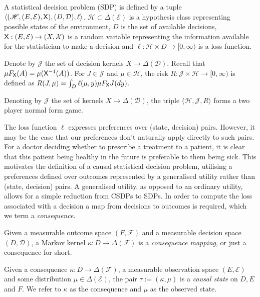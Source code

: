 \begin{definition}
A statistical decision problem (SDP) is defined by a tuple $\langle (\mathscr{H},(E,\mathcal{E}), \mathsf{X}), (D,\mathcal{D}), \ell\rangle$. $\mathscr{H}\subset\Delta(\mathcal{E})$ is a hypothesis class representing possible states of the environment, $D$ is the set of available decisions, $\mathsf{X}:(E,\mathcal{E})\to (X,\mathcal{X})$ is a random variable representing the information available for the statistician to make a decision and $\ell:\mathcal{H}\times D\to [0,\infty)$ is a loss function.

Denote by $\mathscr{J}$ the set of decision kernels $X\to \Delta(\mathcal{D})$. Recall that $\mu F_{\mathsf{X}}(A)=\mu(\mathsf{X}^{-1}(A))$. For $J\in \mathscr{J}$ and $\mu\in \mathcal{H}$, the risk $R:\mathscr{J}\times\mathscr{H}\to [0,\infty)$ is defined as $R(J,\mu) = \int_D \ell(\mu,y) \mu F_{\mathsf{X}} J(dy)$.

Denoting by $\mathscr{J}$  the set of kernels $X\to \Delta(\mathcal{D})$, the triple $\langle \mathscr{H}, \mathscr{J}, R\rangle$ forms a two player normal form game.
\end{definition}


The loss function $\ell$ expresses preferences over (state, decision) pairs. However, it may be the case that our preferences don't naturally apply directly to such pairs. For a doctor deciding whether to prescribe a treatment to a patient, it is clear that this patient being healthy in the future is preferable to them being sick. This motivates the definition of a causal statistical decision problem, utilising a preferences defined over outcomes represented by a generalised utility rather than (state, decision) pairs. A generalised utility, as opposed to an ordinary utility, allows for a simple reduction from CSDPs to SDPs. In order to compute the loss associated with a decision a map from decisions to outcomes is required, which we term a \emph{consequence}.

\begin{definition}[Consequences]
Given a measurable outcome space $(F,\mathcal{F})$ and a measurable decision space $(D,\mathcal{D})$, a Markov kernel $\kappa:D \to \Delta(\mathcal{F})$ is a \emph{consequence mapping}, or just a consequence for short.
\end{definition}

\begin{definition}
Given a consequence $\kappa:D\to \Delta(\mathcal{F})$, a measurable observation space $(E,\mathcal{E})$ and some distribution $\mu\in \Delta(\mathcal{E})$, the pair $\tau:=(\kappa,\mu)$ is a \emph{causal state} on $D, E$ and $F$. We refer to $\kappa$ as the consequence and $\mu$ as the observed state.
\end{definition}

